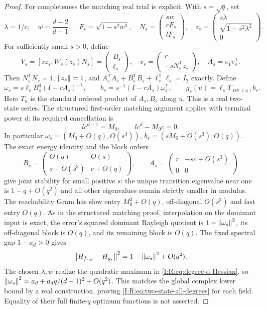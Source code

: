\begin{proof}
For completeness the matching real trial is explicit.  With
$s=\sqrt q$, set
\[
 \lambda=1/c,\quad w=\frac{d-2}{d-1},\quad
 F_s=\sqrt{1-s^2w^2},\quad
 N_s=\begin{pmatrix}sw\\cF_s\\lF_s\end{pmatrix},\quad
 z_s=\begin{pmatrix}s\lambda\\\sqrt{1-s^2\lambda^2}\\0\end{pmatrix}.
\]
For sufficiently small $s>0$, define
\[
 V_s=[sz_s,W_s(z_s)N_s]=\begin{pmatrix}B_s\\\ell_s\end{pmatrix},
 \quad v_s=\begin{pmatrix}r\\-sN_s^{\mathsf T}z_s\end{pmatrix},
 \quad A_s=e_1v_s^{\mathsf T}.
\]
Then $N_s^{\mathsf T}N_s=1$, $\left\lVert z_s\right\rVert=1$, and
$A_s^{\mathsf T}A_s+B_s^{\mathsf T}B_s+
\ell_s^{\mathsf T}\ell_s=I_2$ exactly.  Define
\[
 \omega_s=s\ell_sB_s^d(I-rA_s)^{-1},\qquad
 b_s=s^{-1}(I-rA_s)\omega_s^{\mathsf T},\qquad
 g_s(u)=\ell_sT_{\operatorname{rev}(u)}b_s.
\]
Here $T_u$ is the standard ordered product of $A_s,B_s$ along $u$.
This is a real two-state series.  The structured first-order matching
argument applies with terminal power $d$: its required cancellation is
\[
 l c^{d-1}=M_0,\qquad
 l c^d-M_0c=0.
\]
In particular
$\omega_s=(M_0+O(q),O(s^3))$, $b_s=(sM_0+O(s^3),O(q))$.
The exact energy identity and the block orders
\[
 B_s=\begin{pmatrix}O(q)&O(s)\\s+O(s^3)&c+O(q)\end{pmatrix},
 \qquad
 A_s=\begin{pmatrix}r&-sc+O(s^3)\\0&0\end{pmatrix}
\]
give joint stability for small positive $s$: the unique transition
eigenvalue near one is $1-q+O(q^2)$ and all other eigenvalues remain
strictly smaller in modulus.  The reachability Gram has slow entry
$M_0^2+O(q)$, off-diagonal $O(s^3)$ and fast entry $O(q)$.
As in the structured matching proof, interpolation on the dominant
input is exact, the error's squared dominant Rayleigh quotient is
$1-\left\lVert\omega_s\right\rVert^2$, its off-diagonal block is $O(q)$, and its
remaining block is $O(q)$.  The fixed spectral gap $1-a_d>0$ gives
\[
 \left\lVert H_{f_{r,d}}-H_{g_s}\right\rVert^2
       =1-\left\lVert\omega_s\right\rVert^2+O(q^2).
\]
The chosen $\lambda,w$ realize the quadratic maximum in
\eqref{I:R:eq:degree-d-Hessian}, so
$\left\lVert\omega_s\right\rVert^2=a_d+a_dq/(d-1)^2+O(q^2)$.
This matches the global complex lower bound by a real construction,
proving \eqref{I:R:eq:two-state-all-degrees} for each field.  Equality of
their full finite-$q$ optimum functions is not asserted.
\end{proof}
